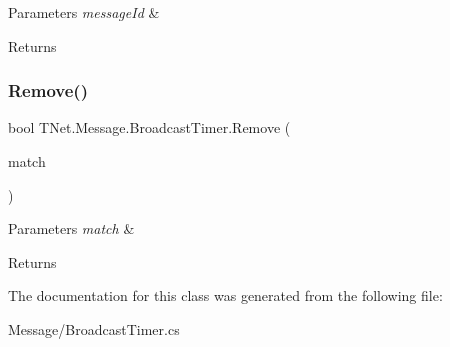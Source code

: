 \begin{DoxyParams}{Parameters}
{\em message\+Id} & \\
\hline
\end{DoxyParams}
\begin{DoxyReturn}{Returns}

\end{DoxyReturn}
\mbox{\label{class_t_net_1_1_message_1_1_broadcast_timer_a2bf88ef8fa26ae3e0b03c90806c8fc19}} 
\subsubsection{\texorpdfstring{Remove()}{Remove()}\hspace{0.1cm}{\footnotesize\ttfamily [2/2]}}
{\footnotesize\ttfamily bool T\+Net.\+Message.\+Broadcast\+Timer.\+Remove (\begin{DoxyParamCaption}\item[{Predicate$<$ \mbox{\hyperlink{class_t_net_1_1_message_1_1_notice_message}{Notice\+Message}} $>$}]{match }\end{DoxyParamCaption})}






\begin{DoxyParams}{Parameters}
{\em match} & \\
\hline
\end{DoxyParams}
\begin{DoxyReturn}{Returns}

\end{DoxyReturn}


The documentation for this class was generated from the following file\+:\begin{DoxyCompactItemize}
\item 
Message/Broadcast\+Timer.\+cs\end{DoxyCompactItemize}
